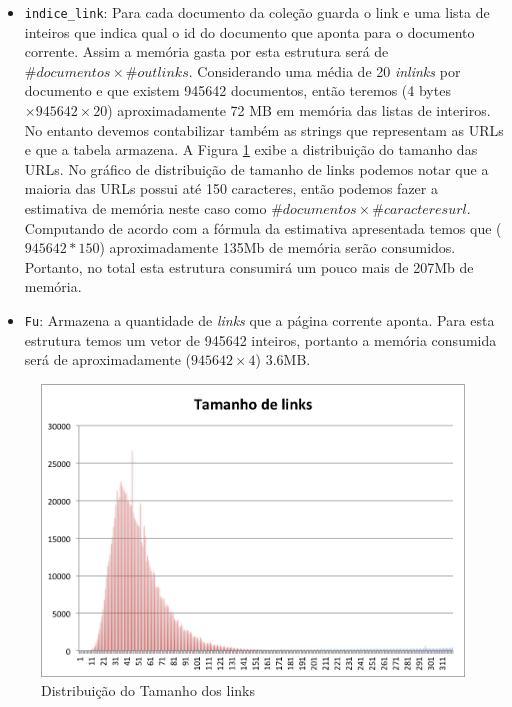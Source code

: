 \documentclass[a4paper]{article}
\begin{document}
\begin{itemize}
    \item \texttt{indice\_link}: Para cada documento da coleção guarda o link e uma lista de inteiros que 
	indica qual o id do documento que aponta para o documento corrente. Assim a memória gasta por esta 
	estrutura será de $\#documentos\times\#outlinks$. Considerando uma média de 20 \emph{inlinks} por 
	documento e que existem 945642 documentos, então teremos (4 bytes $\times 945642 \times 20$) aproximadamente 
	72 MB em memória das listas de interiros. No entanto devemos contabilizar também as strings que 
	representam as URLs e que a tabela armazena. A Figura \ref{pic:distlinks} exibe a distribuição 
	do tamanho das URLs. No gráfico de distribuição de tamanho de links podemos notar que a maioria 
	das URLs possui até 150 caracteres, então podemos fazer a estimativa de memória neste caso 
	como $\#documentos\times\#caracteresurl$. Computando de acordo com a fórmula da estimativa 
	apresentada temos que ($945642*150$) aproximadamente 135Mb de memória serão consumidos. Portanto, 
	no total esta estrutura consumirá um pouco mais de 207Mb de memória.
    \item \texttt{Fu}: Armazena a quantidade de \emph{links} que a página corrente aponta. Para 
	esta estrutura temos um vetor de 945642 inteiros, portanto a memória consumida será de aproximadamente 
	($945642\times4$) 3.6MB. 
\end{itemize}

\begin{figure}[H]
    \centering
    \includegraphics[scale=0.5]{distribuicaolinks.png}
    \caption{Distribuição do Tamanho dos links}
    \label{pic:distlinks}
\end{figure}
\end{document}

